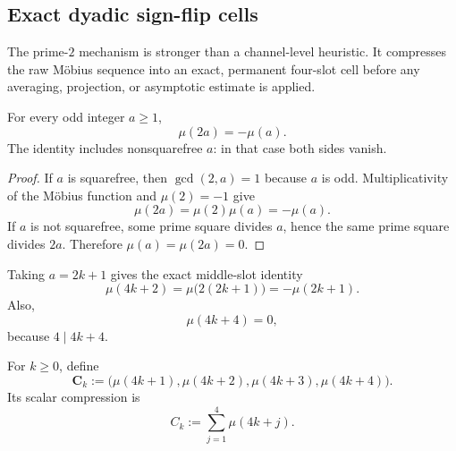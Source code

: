 
\subsection{Exact dyadic sign-flip cells}
\label{subsec:exact-dyadic-cells}

The prime-$2$ mechanism is stronger than a channel-level heuristic.  It
compresses the raw M\"obius sequence into an exact, permanent four-slot cell
before any averaging, projection, or asymptotic estimate is applied.

\begin{theorem}
\label{thm:exact-dyadic-sign-reversal}
For every odd integer $a\ge1$,
\begin{equation}
 \boxed{\mu(2a)=-\mu(a).}
 \label{eq:mobius-doubling-odd}
\end{equation}
The identity includes nonsquarefree $a$: in that case both sides vanish.
\end{theorem}

\begin{proof}
If $a$ is squarefree, then $\gcd(2,a)=1$ because $a$ is odd.  Multiplicativity
of the M\"obius function and $\mu(2)=-1$ give
\[
 \mu(2a)=\mu(2)\mu(a)=-\mu(a).
\]
If $a$ is not squarefree, some prime square divides $a$, hence the same prime
square divides $2a$.  Therefore $\mu(a)=\mu(2a)=0$.
\end{proof}

Taking $a=2k+1$ gives the exact middle-slot identity
\begin{equation}
 \boxed{
 \mu(4k+2)
 =\mu\bigl(2(2k+1)\bigr)
 =-\mu(2k+1).
 }
 \label{eq:four-k-plus-two-flip}
\end{equation}
Also,
\begin{equation}
 \boxed{\mu(4k+4)=0,}
 \label{eq:fourth-slot-zero}
\end{equation}
because $4\mid4k+4$.

\begin{definition}
\label{def:complete-four-slot-cell}
For $k\ge0$, define
\begin{equation}
 \mathbf C_k
 :=\bigl(
    \mu(4k+1),
    \mu(4k+2),
    \mu(4k+3),
    \mu(4k+4)
   \bigr).
 \label{eq:four-slot-cell-raw}
\end{equation}
Its scalar compression is
\begin{equation}
 C_k:=\sum_{j=1}^{4}\mu(4k+j).
 \label{eq:compressed-cell-definition}
\end{equation}
\end{definition}

